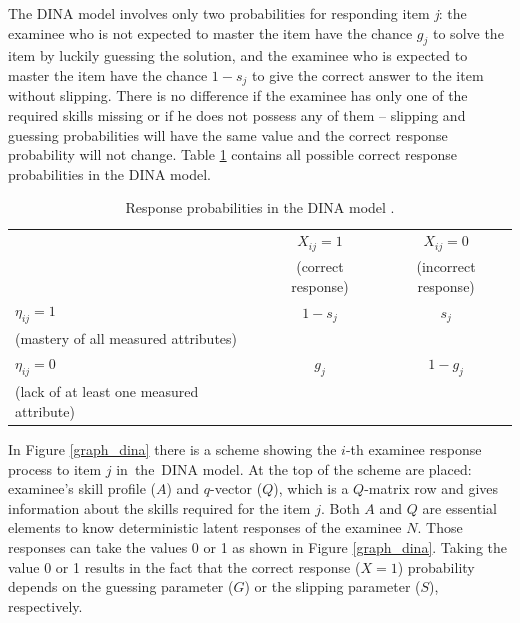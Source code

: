 \documentclass[english]{pwr_wmat_praca_dyplomowa}
\theoremstyle{plain}
\theoremstyle{definition}
\numberwithin{theorem}{chapter}
\begin{document}
The DINA model involves only two probabilities for responding item \textit{j}: the examinee who is not expected to master the item have the chance $g_j$ to solve the item by luckily guessing the solution, and the examinee who is expected to master the item have the chance $1 - s_j$ to give the correct answer to the item without slipping. There is no difference if the examinee has only one of the required skills missing or if he does not possess any of them -- slipping and guessing probabilities will have the same value and the correct response probability will not change. Table \ref{tab:response_prob} contains all possible correct response probabilities in the DINA model.

\begin{table}[H]
	\centering
	\begin{tabular}{l c c} 
		\hline
		{\rule{0pt}{3ex}} & $X_{ij} = 1$ & $X_{ij} = 0$ \\
		& (correct response) & (incorrect response) \\ [0.5ex]
		\hline 
		{\rule{0pt}{3ex}} $\eta_{ij} = 1$ & $1- s_j$ & $s_j$ \\ 
		(mastery of all measured attributes) & & \\[1ex] 
		$\eta_{ij} = 0$ & $g_j$ & $1-g_j$ \\ 
		(lack of at least one measured attribute) & & \\[0.5ex] 
		\hline
	\end{tabular}
	\caption{Response probabilities in the DINA model \cite{book_tables}.}
	\label{tab:response_prob} 
\end{table}

In Figure \ref{graph_dina} there is a scheme showing the $i$-th examinee response process to item $j$ in~the~DINA model. At the top of the scheme are placed: examinee's skill profile ($A$) and $q$-vector ($Q$), which is a $Q$-matrix row and gives information about the skills required for the item $j$. Both $A$ and $Q$ are essential elements to know deterministic latent responses of the examinee $N$. Those responses can take the values 0 or 1 as shown in Figure \ref{graph_dina}. Taking the value 0 or 1 results in the fact that the correct response ($X=1$) probability depends on the guessing parameter ($G$) or the slipping parameter ($S$), respectively.
\end{document}
